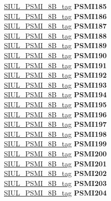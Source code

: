\begin{DoxyCompactItemize}
\begin{tabbing}
\>\>\mbox{\hyperlink{unionSIUL__PSMI__8B__tag}{SIUL\_PSMI\_8B\_tag}} {\bfseries PSMI185}\\
\>\>\mbox{\hyperlink{unionSIUL__PSMI__8B__tag}{SIUL\_PSMI\_8B\_tag}} {\bfseries PSMI186}\\
\>\>\mbox{\hyperlink{unionSIUL__PSMI__8B__tag}{SIUL\_PSMI\_8B\_tag}} {\bfseries PSMI187}\\
\>\>\mbox{\hyperlink{unionSIUL__PSMI__8B__tag}{SIUL\_PSMI\_8B\_tag}} {\bfseries PSMI188}\\
\>\>\mbox{\hyperlink{unionSIUL__PSMI__8B__tag}{SIUL\_PSMI\_8B\_tag}} {\bfseries PSMI189}\\
\>\>\mbox{\hyperlink{unionSIUL__PSMI__8B__tag}{SIUL\_PSMI\_8B\_tag}} {\bfseries PSMI190}\\
\>\>\mbox{\hyperlink{unionSIUL__PSMI__8B__tag}{SIUL\_PSMI\_8B\_tag}} {\bfseries PSMI191}\\
\>\>\mbox{\hyperlink{unionSIUL__PSMI__8B__tag}{SIUL\_PSMI\_8B\_tag}} {\bfseries PSMI192}\\
\>\>\mbox{\hyperlink{unionSIUL__PSMI__8B__tag}{SIUL\_PSMI\_8B\_tag}} {\bfseries PSMI193}\\
\>\>\mbox{\hyperlink{unionSIUL__PSMI__8B__tag}{SIUL\_PSMI\_8B\_tag}} {\bfseries PSMI194}\\
\>\>\mbox{\hyperlink{unionSIUL__PSMI__8B__tag}{SIUL\_PSMI\_8B\_tag}} {\bfseries PSMI195}\\
\>\>\mbox{\hyperlink{unionSIUL__PSMI__8B__tag}{SIUL\_PSMI\_8B\_tag}} {\bfseries PSMI196}\\
\>\>\mbox{\hyperlink{unionSIUL__PSMI__8B__tag}{SIUL\_PSMI\_8B\_tag}} {\bfseries PSMI197}\\
\>\>\mbox{\hyperlink{unionSIUL__PSMI__8B__tag}{SIUL\_PSMI\_8B\_tag}} {\bfseries PSMI198}\\
\>\>\mbox{\hyperlink{unionSIUL__PSMI__8B__tag}{SIUL\_PSMI\_8B\_tag}} {\bfseries PSMI199}\\
\>\>\mbox{\hyperlink{unionSIUL__PSMI__8B__tag}{SIUL\_PSMI\_8B\_tag}} {\bfseries PSMI200}\\
\>\>\mbox{\hyperlink{unionSIUL__PSMI__8B__tag}{SIUL\_PSMI\_8B\_tag}} {\bfseries PSMI201}\\
\>\>\mbox{\hyperlink{unionSIUL__PSMI__8B__tag}{SIUL\_PSMI\_8B\_tag}} {\bfseries PSMI202}\\
\>\>\mbox{\hyperlink{unionSIUL__PSMI__8B__tag}{SIUL\_PSMI\_8B\_tag}} {\bfseries PSMI203}\\
\>\>\mbox{\hyperlink{unionSIUL__PSMI__8B__tag}{SIUL\_PSMI\_8B\_tag}} {\bfseries PSMI204}\\

\end{tabbing}
\end{DoxyCompactItemize}
